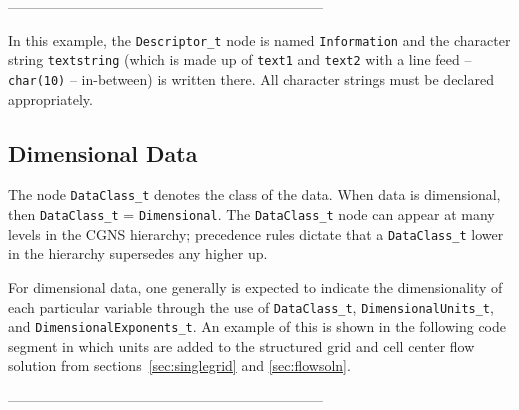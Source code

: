 \documentclass[12pt]{article}
\begin{document}
--------------------------------------------------------------------

\noindent In this example, the {\tt Descriptor\_t} node
is named {\tt Information} and
the character string {\tt textstring} (which is made up of {\tt text1}
and {\tt text2} with a line feed -- {\tt char(10)} -- in-between) is written there.
All character strings must be declared appropriately.

\subsection{Dimensional Data} \label{sec:dimens}

The node {\tt DataClass\_t} denotes the class of the data.  When
data is dimensional, then {\tt DataClass\_t} = {\tt Dimensional}.
The {\tt DataClass\_t} node can appear at many levels in the CGNS
hierarchy; precedence rules dictate that a {\tt DataClass\_t}
lower in the hierarchy supersedes any higher up.

For dimensional data, one generally is expected to indicate the
dimensionality of each particular variable through the use of
{\tt DataClass\_t}, {\tt DimensionalUnits\_t}, and
{\tt DimensionalExponents\_t}.  An example of this is
shown in the following code segment in which units are added
to the structured grid and cell center flow solution from 
sections~\ref{sec:singlegrid} and \ref{sec:flowsoln}.

--------------------------------------------------------------------
\end{document}
